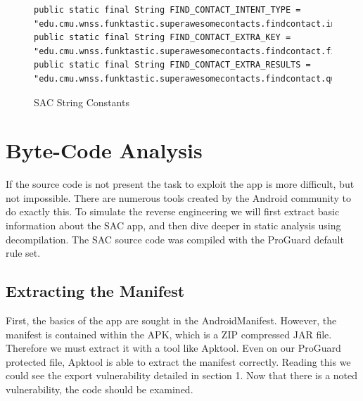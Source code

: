 \documentclass[conference,compsoc]{IEEEtran}
\begin{document}
\begin{figure}[tbp]
\begin{lstlisting}
public static final String FIND_CONTACT_INTENT_TYPE = "edu.cmu.wnss.funktastic.superawesomecontacts.findcontact.intent.type";
public static final String FIND_CONTACT_EXTRA_KEY = "edu.cmu.wnss.funktastic.superawesomecontacts.findcontact.findQueryString";
public static final String FIND_CONTACT_EXTRA_RESULTS = "edu.cmu.wnss.funktastic.superawesomecontacts.findcontact.queryResults";
\end{lstlisting}
\caption{SAC String Constants}
\label{fig:StringConstants}
\end{figure}







\section{Byte-Code Analysis}
If the source code is not present the task to exploit the app is more difficult, but not impossible. There are numerous tools created by the Android community to do exactly this. To simulate the reverse engineering we will first extract basic information about the SAC app, and then dive deeper in static analysis using decompilation. The SAC source code was compiled with the ProGuard default rule set.

\subsection{Extracting the Manifest}
First, the basics of the app are sought in the AndroidManifest. However, the manifest is contained within the APK, which is a ZIP compressed JAR file. Therefore we must extract it with a tool like Apktool\cite{apktool}. Even on our ProGuard protected file, Apktool is able to extract the manifest correctly. Reading this we could see the export vulnerability detailed in section 1. Now that there is a noted vulnerability, the code should be examined.
\end{document}
